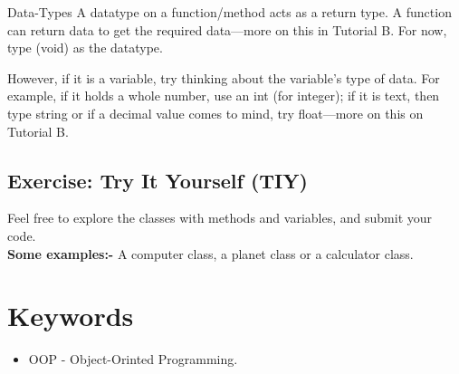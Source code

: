 \documentclass[10pt]{article}
\begin{document}
    \begin{tip}{Data-Types}
        A datatype on a function/method acts as a return type. A function can return data to get the required data—more on this in Tutorial B. For now, type (void) as the datatype.

        However, if it is a variable, try thinking about the variable's type of data. For example, if it holds a whole number, use an int (for integer); if it is text, then type string or if a decimal value comes to mind, try float—more on this on Tutorial B. 
    \end{tip}

    \subsection{Exercise: Try It Yourself (TIY)}
        Feel free to explore the classes with methods and variables, and submit your code.\\
        \textbf{Some examples:-} A computer class, a planet class or a calculator class.
\section{Keywords}
\label{sec:keywords}
    \begin{itemize}
        \item OOP - Object-Orinted Programming.
    \end{itemize}

\clearpage
\nocite{*}
\small{
}
\end{document}

